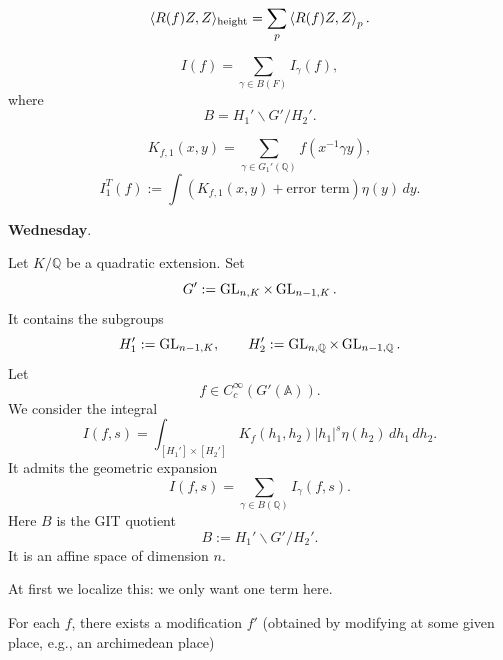 \documentclass[reqno]{amsart} 
\begin{document}
\begin{equation*}
\langle R(f) Z, Z \rangle_{\operatorname{height}} = \sum_p \left\langle R(f) Z , Z \right\rangle_p.
\end{equation*}

\begin{equation*}
I(f) = \sum_{\gamma \in B(F)} I_\gamma(f),
\end{equation*}
where
\begin{equation*}
B = H_1 ' \backslash G ' / H_2 '.
\end{equation*}

\begin{equation*}
K_{f, 1}(x, y) = \sum_{\gamma \in G_1 '(\mathbb{Q})} f(x^{-1} \gamma y),
\end{equation*}
\begin{equation*}
I_1^T(f) := \int (K_{f, 1}(x, y) + \text{error term}) \eta(y) \, d y.
\end{equation*}


\textbf{Wednesday}.

Let $K / \mathbb{Q}$ be a quadratic extension.  Set
\begin{equation*}
  G ' := \operatorname{GL}_{n, K} \times \operatorname{GL}_{n - 1, K}.
\end{equation*}
It contains the subgroups
\begin{equation*}
  H_1 ' := \operatorname{GL}_{n - 1, K}, \qquad H_2 ' := \operatorname{GL}_{n, \mathbb{Q}} \times \operatorname{GL}_{n - 1, \mathbb{Q}}.
\end{equation*}
Let
\begin{equation*}
  f \in C_c^\infty(G '(\mathbb{A})).
\end{equation*}
We consider the integral
\begin{equation*}
  I(f, s ) = \int_{[H_1 ' ] \times [H_2 ' ] } K_f(h_1, h_2 ) \lvert h_1  \rvert^s \eta(h_2 ) \, d h_1 \, d h_2.
\end{equation*}
It admits the geometric expansion
\begin{equation*}
  I(f, s) = \sum_{\gamma \in B(\mathbb{Q} )} I_\gamma(f , s).
\end{equation*}
Here $B$ is the GIT quotient
\begin{equation*}
  B := H_1 ' \backslash G ' / H_2 '.
\end{equation*}
It is an affine space of dimension $n$.

At first we localize this: we only want one term here.

For each $f$, there exists a modification $f'$ (obtained by modifying at some given place, e.g., an archimedean place)
\end{document}
